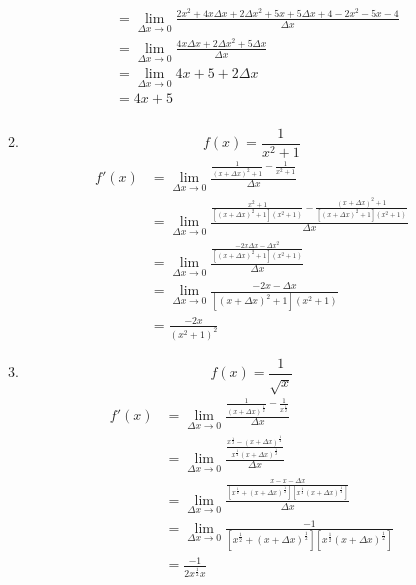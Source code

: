 \documentclass{article}
\begin{document}
\begin{enumerate}
\begin{enumerate}
\begin{align*}
            &= \lim_{\Delta x \to 0} \frac{2x^2 + 4x\Delta x + 2 \Delta x^2 + 5x + 5\Delta x + 4 - 2x^2 -5x -4}{\Delta x} \\
            &= \lim_{\Delta x \to 0} \frac{4x\Delta x + 2 \Delta x^2  + 5\Delta x}{\Delta x} \\
            &= \lim_{\Delta x \to 0} 4x + 5 + 2\Delta x \\
            &= 4 x + 5 \\
        \end{align*}
        \item 
        \begin{equation*}
            f(x) = \frac{1}{x^2 + 1}
        \end{equation*}
        \begin{align*}
            f'(x) &= \lim_{\Delta x \to 0} \frac{\frac{1}{(x+\Delta x)^2+1} - \frac{1}{x^2+1}}{\Delta x} \\
            &= \lim_{\Delta x \to 0} \frac{\frac{x^2+1}{[(x+\Delta x)^2+1](x^2+1)} - \frac{(x+\Delta x)^2+1}{[(x+\Delta x)^2+1](x^2+1)}}{\Delta x} \\
            &= \lim_{\Delta x \to 0} \frac{\frac{-2x \Delta x - \Delta x^2}{[(x+\Delta x)^2+1](x^2+1)}}{\Delta x} \\
            &= \lim_{\Delta x \to 0} \frac{-2x  - \Delta x}{[(x+\Delta x)^2+1](x^2+1)} \\
            &= \frac{-2x}{(x^2+1)^2}
        \end{align*}
        \item 
        \begin{equation*}
            f(x) = \frac{1}{\sqrt{x}}
        \end{equation*}
        \begin{align*}
            f'(x) &= \lim_{\Delta x \to 0} \frac{\frac{1}{(x+\Delta x)^\frac{1}{2}} - \frac{1}{x^\frac{1}{2}}}{\Delta x} \\
            &= \lim_{\Delta x \to 0} \frac{\frac{x^\frac{1}{2} - (x+\Delta x)^\frac{1}{2}}{x^\frac{1}{2}(x+\Delta x)^\frac{1}{2}}}{\Delta x} \\
            &= \lim_{\Delta x \to 0} \frac{\frac{x - x - \Delta x}{[x^\frac{1}{2} + (x+\Delta x)^\frac{1}{2}][x^\frac{1}{2}(x+\Delta x)^\frac{1}{2}]}}{\Delta x} \\
            &= \lim_{\Delta x \to 0} \frac{-1}{[x^\frac{1}{2} + (x+\Delta x)^\frac{1}{2}][x^\frac{1}{2}(x+\Delta x)^\frac{1}{2}]} \\ 
            &= \frac{-1}{2x^\frac{1}{2}x} \\ 

\end{align*}
\end{enumerate}
\end{enumerate}
\end{document}
